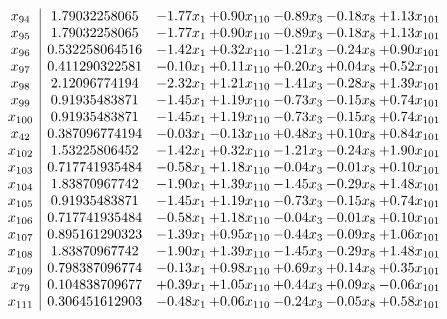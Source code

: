 \documentclass[8pt]{article}
\begin{document}
\[\begin{array}{c| c c@{\hskip 2pt} c@{\hskip 2pt} c@{\hskip 2pt} c@{\hskip 2pt} c@{\hskip 2pt} }
 x_{94}   &  1.79032258065 & -1.77 x_{1} & +  0.90 x_{110} & -0.89 x_{3} & -0.18 x_{8} & +  1.13 x_{101}\\
 x_{95}   &  1.79032258065 & -1.77 x_{1} & +  0.90 x_{110} & -0.89 x_{3} & -0.18 x_{8} & +  1.13 x_{101}\\
 x_{96}   &  0.532258064516 & -1.42 x_{1} & +  0.32 x_{110} & -1.21 x_{3} & -0.24 x_{8} & +  0.90 x_{101}\\
 x_{97}   &  0.411290322581 & -0.10 x_{1} & +  0.11 x_{110} & +  0.20 x_{3} & +  0.04 x_{8} & +  0.52 x_{101}\\
 x_{98}   &  2.12096774194 & -2.32 x_{1} & +  1.21 x_{110} & -1.41 x_{3} & -0.28 x_{8} & +  1.39 x_{101}\\
 x_{99}   &  0.91935483871 & -1.45 x_{1} & +  1.19 x_{110} & -0.73 x_{3} & -0.15 x_{8} & +  0.74 x_{101}\\
 x_{100}   &  0.91935483871 & -1.45 x_{1} & +  1.19 x_{110} & -0.73 x_{3} & -0.15 x_{8} & +  0.74 x_{101}\\
 x_{42}   &  0.387096774194 & -0.03 x_{1} & -0.13 x_{110} & +  0.48 x_{3} & +  0.10 x_{8} & +  0.84 x_{101}\\
 x_{102}   &  1.53225806452 & -1.42 x_{1} & +  0.32 x_{110} & -1.21 x_{3} & -0.24 x_{8} & +  1.90 x_{101}\\
 x_{103}   &  0.717741935484 & -0.58 x_{1} & +  1.18 x_{110} & -0.04 x_{3} & -0.01 x_{8} & +  0.10 x_{101}\\
 x_{104}   &  1.83870967742 & -1.90 x_{1} & +  1.39 x_{110} & -1.45 x_{3} & -0.29 x_{8} & +  1.48 x_{101}\\
 x_{105}   &  0.91935483871 & -1.45 x_{1} & +  1.19 x_{110} & -0.73 x_{3} & -0.15 x_{8} & +  0.74 x_{101}\\
 x_{106}   &  0.717741935484 & -0.58 x_{1} & +  1.18 x_{110} & -0.04 x_{3} & -0.01 x_{8} & +  0.10 x_{101}\\
 x_{107}   &  0.895161290323 & -1.39 x_{1} & +  0.95 x_{110} & -0.44 x_{3} & -0.09 x_{8} & +  1.06 x_{101}\\
 x_{108}   &  1.83870967742 & -1.90 x_{1} & +  1.39 x_{110} & -1.45 x_{3} & -0.29 x_{8} & +  1.48 x_{101}\\
 x_{109}   &  0.798387096774 & -0.13 x_{1} & +  0.98 x_{110} & +  0.69 x_{3} & +  0.14 x_{8} & +  0.35 x_{101}\\
 x_{79}   &  0.104838709677 & +  0.39 x_{1} & +  1.05 x_{110} & +  0.44 x_{3} & +  0.09 x_{8} & -0.06 x_{101}\\
 x_{111}   &  0.306451612903 & -0.48 x_{1} & +  0.06 x_{110} & -0.24 x_{3} & -0.05 x_{8} & +  0.58 x_{101}\\

\end{array}\]
\end{document}
